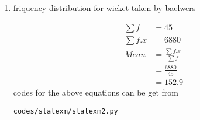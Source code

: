 \renewcommand{\theequation}{\theenumi}
\begin{enumerate}[label=\arabic*.,ref=\thesubsection.\theenumi]
\item\begin{table}[!ht]
	\centering
	
	\caption{friquency distribution for wicket taken by baelwers }
\end{table}
\begin{align}
\sum{f} &= 45
\\
\sum{f.x} &= 6880
\\
Mean &= \frac{\sum{f.x}}{\sum{f}}
\\&= \frac{6880}{45}
\\&= 152.9
\end{align}
codes for the above equations can be get from
\begin{lstlisting}
codes/statexm/statexm2.py
\end{lstlisting}
\end{enumerate}